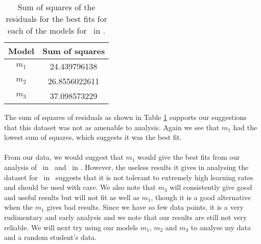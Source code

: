 \begin{table}[ht!]
\centering
\begin{tabular}{|c|c|}
\hline
{\bf Model} & Sum of squares \\
\hline
$m_1$ & 24.439796138\\
\hline
$m_2$ & 26.8556022611\\
\hline
$m_3$ & 37.098573229\\
\hline
\end{tabular}
\caption{Sum of squares of the residuals for the best fits for each of the models for \PT\ in \LA.}
\label{table:P2LA:abc:error}
\end{table}

The sum of squares of residuals as shown in Table \ref{table:P2LA:abc:error}
supports our suggestions that this dataset was not as amenable to analysis.
Again we see that $m_1$ had the lowest sum of squares, which suggests it was the
best fit.\\
\\
From our data, we would suggest that $m_1$ would give the best fits from our analysis of \PT\
in \LA\ and \PO\ in \LB.
However, the useless results it gives in analysing the dataset for \PO\ in \LA\
suggests that it is not tolerant to extremely high learning rates and should be
used with care.
We also note that $m_3$ will consistently give good and useful results but will
not fit as well as $m_1$, though it is a good alternative when the $m_1$ gives
bad results.
Since we have so few data points, it is a very rudimentary and early analysis
and we note that our results are still not very reliable.
We will next try using our models $m_1$, $m_2$ and $m_3$ to analyse my data and
a random student's data.
